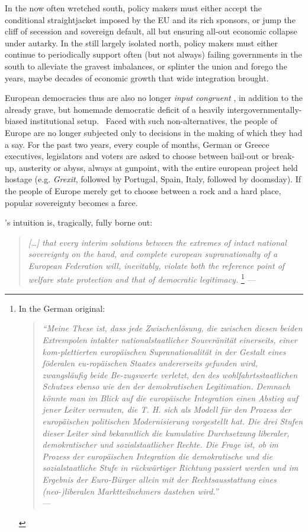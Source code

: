 \documentclass[11pt,a4paper,oneside]{article}
\begin{document}
In the now often wretched south, policy makers must either accept the conditional straightjacket imposed by the \gls{EU} and its rich sponsors, or jump the cliff of secession and sovereign default, all but ensuring all-out economic collapse under autarky.
In the still largely isolated north, policy makers must either continue to periodically support often (but not always) failing governments in the south to alleviate the gravest imbalances, or splinter the union and forego the years, maybe decades of economic growth that wide integration brought.

European democracies thus are also no longer \emph{input congruent} \citep{Zurn-2000-aa}, in addition to the already grave, but homemade democratic deficit of a heavily intergovernmentally-biased institutional setup.~
Faced with such non-alternatives, the people of Europe are no longer subjected only to decisions in the making of which they had a say.
For the past two years, every couple of months, German or Greece executives, legislators and voters are asked to choose between bail-out or break-up, austerity or abyss, always at gunpoint, with the entire european project held hostage (e.g. \emph{Grexit}, followed by Portugal, Spain, Italy, followed by doomsday).
If the people of Europe merely get to choose between a rock and a hard place, popular sovereignty becomes a farce.

\citeauthor{Offe1998}'s \citeyear{Offe1998} intuition is, tragically, fully borne out:
\begin{quote}
	\emph{[\ldots] that every interim solutions between the extremes of intact national sovereignty on the hand, and complete european supranationalty of a European Federation will, inevitably, violate both the reference point of welfare state protection and that of democratic legitimacy.}
	\footnote{\label{fn:Offe-regress}
		In the German original:\\
		\begin{quote}
			\emph{``Meine These ist, dass jede Zwischenl\"{o}sung, die zwischen diesen beiden Extrempolen intakter nationalstaatlicher Souver\"{a}nit\"{a}t einerseits, einer kom-plettierten europ\"{a}ischen Supranationalität in der Gestalt eines föderalen eu-ropäischen Staates andererseits gefunden wird, zwangsl\"{a}ufig beide Be-zugswerte verletzt, den des wohlfahrtsstaatlichen Schutzes ebenso wie den der demokratischen Legitimation.
			Demnach k\"{o}nnte man im Blick auf die europäische Integration einen Abstieg auf jener Leiter vermuten, die T. H. \cite{Marshall-1950-aa} sich als Modell für den Prozess der europ\"{a}ischen politischen Modernisierung vorgestellt hat.
			Die drei Stufen dieser Leiter sind bekanntlich die kumulative Durchsetzung liberaler, demokratischer und sozialstaatlicher Rechte.
			Die Frage ist, ob im Prozess der europäischen Integration die demokratische und die sozialstaatliche Stufe in r\"{u}ckw\"{a}rtiger Richtung passiert werden und im Ergebnis der Euro-B\"{u}rger allein mit der Rechtsausstattung eines (neo-)liberalen Marktteilnehmers dastehen wird.''}\\
			--- \cite[41]{Offe1998}\\
		\end{quote}
	}
	--- \cite[41]{Offe1998}
\end{quote}
\end{document}
